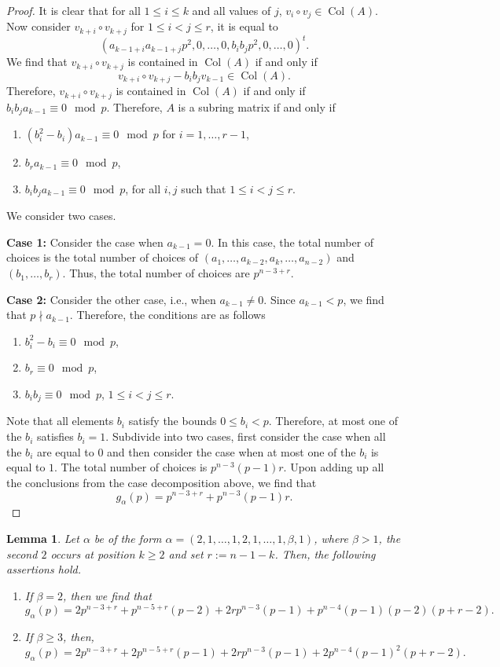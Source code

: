 \documentclass[a4paper]{amsart}
\newtheorem{lemma}[theorem]{Lemma}
\numberwithin{equation}{section}
\theoremstyle{remark}
\newcommand{\op}[1]{\operatorname{#1}}
\begin{document}
\begin{proof}
\par It is clear that for all $1\leq i\leq k$ and all values of $j$, $v_i \circ v_j\in \op{Col}(A)$. Now consider $v_{k+i}\circ v_{k+j}$ for $1\leq i<j\leq r$, it is equal to \[\left(a_{k-1+i} a_{k-1+j}p^2, 0, \dots, 0, b_i b_j p^2, 0, \dots, 0\right)^t.\] We find that $v_{k+i}\circ v_{k+j}$ is contained in $\op{Col}(A)$ if and only if 
\[v_{k+i}\circ v_{k+j}-b_i b_j v_{k-1}\in \op{Col}(A).\] Therefore, $v_{k+i}\circ v_{k+j}$ is contained in $\op{Col}(A)$ if and only if $b_ib_ja_{k-1}\equiv 0 \mod{p}$. Therefore, $A$ is a subring matrix if and only if 
\begin{enumerate}
    \item $(b_i^2-b_i)a_{k-1}\equiv 0 \mod{p}$ for $i=1, \dots, r-1$, 
    \item $b_ra_{k-1}\equiv 0\mod{p}$, 
    \item $b_ib_ja_{k-1}\equiv 0\mod{p}$, for all $i, j$ such that $1\leq i<j\leq r$. 
\end{enumerate}
We consider two cases.
\par \textbf{Case 1:} Consider the case when $a_{k-1}=0$. In this case, the total number of choices is the total number of choices of $(a_1, \dots, a_{k-2}, a_{k}, \dots, a_{n-2})$ and $(b_1, \dots, b_r)$. Thus, the total number of choices are $p^{n-3+r}$.
\par \textbf{Case 2:} Consider the other case, i.e., when $a_{k-1}\neq 0$. Since $a_{k-1}<p$, we find that $p\nmid a_{k-1}$. Therefore, the conditions are as follows
\begin{enumerate}
    \item $b_i^2-b_i\equiv 0\mod{p}$, 
    \item $b_r\equiv 0\mod{p}$, 
    \item $b_i b_j\equiv 0\mod{p}$, $1\leq i<j\leq r$.
\end{enumerate}
Note that all elements $b_i$ satisfy the bounds $0\leq b_i<p$. Therefore, at most one of the $b_i$ satisfies $b_i=1$. Subdivide into two cases, first consider the case when all the $b_i$ are equal to $0$ and then consider the case when at most one of the $b_i$ is equal to $1$. The total number of choices is $p^{n-3}(p-1)r$. Upon adding up all the conclusions from the case decomposition above, we find that
\[g_\alpha(p)=p^{n-3+r}+p^{n-3}(p-1)r.\]
  \end{proof}
 
\begin{lemma}\label{lemma 3}
 Let $\alpha$ be of the form $\alpha=(2,1,\dots, 1, 2, 1,\dots, 1, \beta,1)$, where $\beta>1$, the second $2$ occurs at position $k\geq 2$ and set $r:=n-1-k$. Then, the following assertions hold.
 \begin{enumerate}
    \item If $\beta = 2$, then we find that
    \[g_\alpha(p)=2p^{n-3+r} + p^{n-5+r}(p-2) + 2rp^{n-3}(p-1) + p^{n-4}(p-1)(p-2)(p+r-2).\]
    \item If $\beta \geq 3$, then,
    \[g_\alpha(p)=2p^{n-3+r} + 2p^{n-5+r}(p-1) + 2rp^{n-3}(p-1) + 2p^{n-4}(p-1)^2(p+r-2).\]
\end{enumerate}
\end{lemma}
\end{document}
